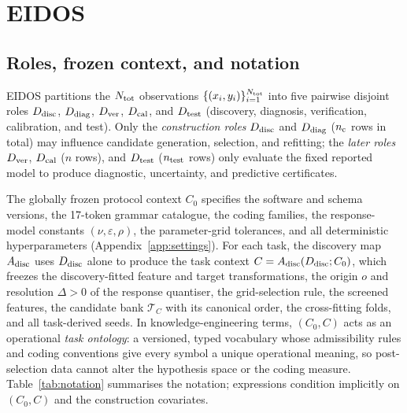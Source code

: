 \section{EIDOS}\label{sec:eidos}

\subsection{Roles, frozen context, and notation}\label{sec:roles}

EIDOS partitions the \(N_{\rm tot}\) observations \(\{(x_i,y_i)\}_{i=1}^{N_{\rm tot}}\) into five pairwise disjoint roles \(D_{\rm disc}\), \(D_{\rm diag}\), \(D_{\rm ver}\), \(D_{\rm cal}\), and \(D_{\rm test}\) (discovery, diagnosis, verification, calibration, and test). Only the \emph{construction roles} \(D_{\rm disc}\) and \(D_{\rm diag}\) (\(n_{\rm c}\) rows in total) may influence candidate generation, selection, and refitting; the \emph{later roles} \(D_{\rm ver}\), \(D_{\rm cal}\) (\(n\) rows), and \(D_{\rm test}\) (\(n_{\rm test}\) rows) only evaluate the fixed reported model to produce diagnostic, uncertainty, and predictive certificates.

The globally frozen protocol context \(C_0\) specifies the software and schema versions, the 17-token grammar catalogue, the coding families, the response-model constants \((\nu,\varepsilon,\rho)\), the parameter-grid tolerances, and all deterministic hyperparameters (Appendix~\ref{app:settings}). For each task, the discovery map \(A_{\rm disc}\) uses \(D_{\rm disc}\) alone to produce the task context \(C=A_{\rm disc}(D_{\rm disc};C_0)\), which freezes the discovery-fitted feature and target transformations, the origin \(o\) and resolution \(\Delta>0\) of the response quantiser, the grid-selection rule, the screened features, the candidate bank \(\mathcal T_C\) with its canonical order, the cross-fitting folds, and all task-derived seeds. In knowledge-engineering terms, \((C_0,C)\) acts as an operational \emph{task ontology}: a versioned, typed vocabulary whose admissibility rules and coding conventions give every symbol a unique operational meaning, so post-selection data cannot alter the hypothesis space or the coding measure. Table~\ref{tab:notation} summarises the notation; expressions condition implicitly on \((C_0,C)\) and the construction covariates.

